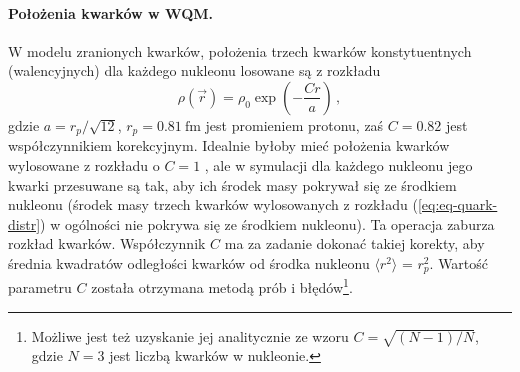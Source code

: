 \documentclass[a4paper,12pt]{article}
\begin{document}

\paragraph{Położenia kwarków w WQM.}
W modelu zranionych kwarków, położenia trzech kwarków konstytuentnych (walencyjnych) dla każdego nukleonu losowane są z rozkładu
\begin{equation}\label{eq:eq-quark-distr}
\rho(\vec{r})=\rho_0\exp\left(-\frac{Cr}{a}\right)\,,
\end{equation}
gdzie $a={r_p}/{\sqrt{12}}$, $r_p=0.81~\mathrm{fm}$ jest promieniem protonu, zaś $C=0.82$ jest współczynnikiem korekcyjnym. Idealnie byłoby mieć położenia kwarków wylosowane z rozkładu o $C=1$ \cite{Adler:2013aqf,Hofstadter:1956qs}, ale w symulacji dla każdego nukleonu jego kwarki przesuwane są tak, aby ich środek masy pokrywał się ze środkiem nukleonu (środek masy trzech kwarków wylosowanych z rozkładu (\ref{eq:eq-quark-distr}) w ogólności nie pokrywa się ze środkiem nukleonu). Ta operacja zaburza rozkład kwarków. Współczynnik $C$ ma za zadanie dokonać takiej korekty, aby średnia kwadratów odległości kwarków od środka nukleonu $\langle r^2 \rangle$  = $r_p^2$. Wartość parametru $C$ została otrzymana metodą prób i błędów\footnote{Możliwe jest też uzyskanie jej analitycznie ze wzoru $C=\sqrt{(N-1)/N}$, gdzie $N=3$ jest liczbą kwarków w nukleonie.}. 
\end{document}
